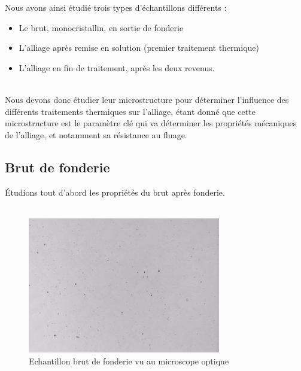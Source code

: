 Nous avons ainsi étudié trois types d'échantillons différents :\\
\begin{itemize}
    \item Le brut, monocristallin, en sortie de fonderie
    \item L'alliage après remise en solution (premier traitement thermique)
    \item L'alliage en fin de traitement, après les deux revenus.\\\\
\end{itemize}



Nous devons donc étudier leur microstructure pour déterminer l'influence des 
différents traitements thermiques sur l'alliage, étant donné que cette microstructure
est le paramètre clé qui va déterminer les propriétés mécaniques de l'alliage,
et notamment sa résistance au fluage.

\subsection*{Brut de fonderie}

Étudions tout d'abord les propriétés du brut après fonderie.\\\\



\begin{figure}[htbp]
    \centering
    \includegraphics[width=0.75\textwidth]{images_optique/brut.pdf}
    \caption{Echantillon brut de fonderie vu au microscope optique}
    \label{}
\end{figure}


